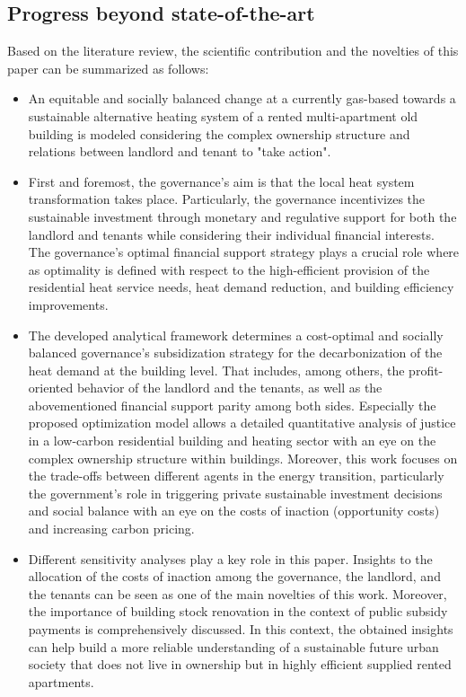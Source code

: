 \subsection{Progress beyond state-of-the-art}\label{novelties}
Based on the literature review, the scientific contribution and the novelties of this paper can be summarized as follows:
\begin{itemize}
	\item An equitable and socially balanced change at a currently gas-based towards a sustainable alternative heating system of a rented multi-apartment old building is modeled considering the complex ownership structure and relations between landlord and tenant to "take action".
	\item First and foremost, the governance's aim is that the local heat system transformation takes place. Particularly, the governance incentivizes the sustainable investment through monetary and regulative support for both the landlord and tenants while considering their individual financial interests. The governance's optimal financial support strategy plays a crucial role where as optimality is defined with respect to the high-efficient provision of the residential heat service needs, heat demand reduction, and building efficiency improvements.
	\item The developed analytical framework determines a cost-optimal and socially balanced governance’s subsidization strategy for the decarbonization of the heat demand at the building level. That includes, among others, the profit-oriented behavior of the landlord and the tenants, as well as the abovementioned financial support parity among both sides.  Especially the proposed optimization model allows a detailed quantitative analysis of justice in a low-carbon residential building and heating sector with an eye on the complex ownership structure within buildings. Moreover, this work focuses on the trade-offs between different agents in the energy transition, particularly the government’s role in triggering private sustainable investment decisions and social balance with an eye on the costs of inaction (opportunity costs) and increasing carbon pricing.	
	\item Different sensitivity analyses play a key role in this paper. Insights to the allocation of the costs of inaction among the governance, the landlord, and the tenants can be seen as one of the main novelties of this work. Moreover, the importance of building stock renovation in the context of public subsidy payments is comprehensively discussed. In this context, the obtained insights can help build a more reliable understanding of a sustainable future urban society that does not live in ownership but in highly efficient supplied rented apartments.
\end{itemize}
